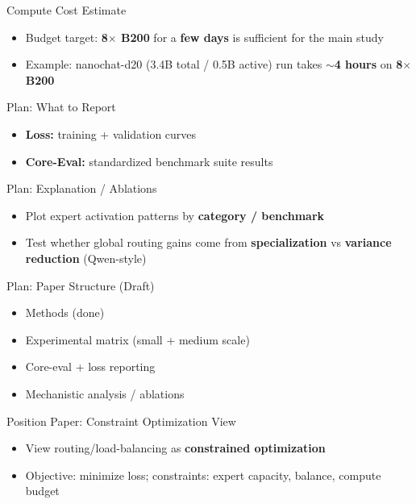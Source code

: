 \documentclass{beamer}
\begin{document}
\begin{frame}{Compute Cost Estimate}
\begin{itemize}
    \item Budget target: \textbf{8$\times$ B200} for a \textbf{few days} is sufficient for the main study
    \item Example: nanochat-d20 (3.4B total / 0.5B active) run takes \textbf{$\sim$4 hours} on \textbf{8$\times$ B200}
\end{itemize}
\end{frame}

\begin{frame}{Plan: What to Report}
\begin{itemize}
    \item \textbf{Loss:} training + validation curves
    \item \textbf{Core-Eval:} standardized benchmark suite results
\end{itemize}
\end{frame}

\begin{frame}{Plan: Explanation / Ablations}
\begin{itemize}
    \item Plot expert activation patterns by \textbf{category / benchmark}
    \item Test whether global routing gains come from \textbf{specialization} vs \textbf{variance reduction} (Qwen-style)
\end{itemize}
\end{frame}

\begin{frame}{Plan: Paper Structure (Draft)}
\begin{itemize}
    \item Methods (done)
    \item Experimental matrix (small + medium scale)
    \item Core-eval + loss reporting
    \item Mechanistic analysis / ablations
\end{itemize}
\end{frame}

\begin{frame}{Position Paper: Constraint Optimization View}
\begin{itemize}
    \item View routing/load-balancing as \textbf{constrained optimization}
    \item Objective: minimize loss; constraints: expert capacity, balance, compute budget
\end{itemize}
\end{frame}
\end{document}
